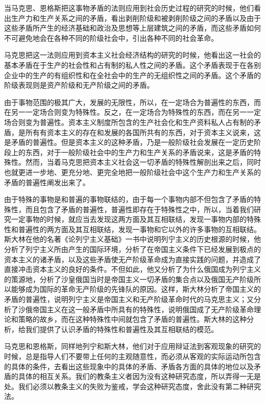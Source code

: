 \documentclass[UTF8, 12pt, a4paper]{ctexrep}
\begin{document}
当马克思、恩格斯把这事物矛盾的法则应用到社会历史过程的研究的时候，他们看出生产力和生产关系之间的矛盾，看出剥削阶级和被剥削阶级之间的矛盾以及由于这些矛盾所产生的经济基础和政治及思想等上层建筑之间的矛盾，而这些矛盾如何不可避免地会在各种不同的阶级社会中，引出各种不同的社会革命。

马克思把这一法则应用到资本主义社会经济结构的研究的时候，他看出这一社会的基本矛盾在于生产的社会性和占有制的私人性之间的矛盾。这个矛盾表现于在各别企业中的生产的有组织性和在全社会中的生产的无组织性之间的矛盾。这个矛盾的阶级表现则是资产阶级和无产阶级之间的矛盾。

由于事物范围的极其广大，发展的无限性，所以，在一定场合为普遍性的东西，而在另一一定场合则变为特殊性。反之，在一定场合为特殊性的东西，而在另一一定场合则变为普遍性。资本主义制度所包含的生产社会化和生产资料私人占有制的矛盾，是所有有资本主义的存在和发展的各国所共有的东西，对于资本主义说来，这是矛盾的普遍性。但是资本主义的这种矛盾，乃是一般阶级社会发展在一定历史阶段上的东西，对于一般阶级社会中的生产力和生产关系的矛盾说来，这是矛盾的特殊性。然而，当着马克思把资本主义社会这一切矛盾的特殊性解剖出来之后，同时也就更进一步地、更充分地、更完全地把一般阶级社会中这个生产力和生产关系的矛盾的普遍性阐发出来了。

由于特殊的事物是和普遍的事物联结的，由于每一个事物内部不但包含了矛盾的特殊性，而且包含了矛盾的普遍性，普遍性即存在于特殊性之中，所以，当着我们研究一定事物的时候，就应当去发现这两方面及其互相联结，发现一事物内部的特殊性和普遍性的两方面及其互相联结，发现一事物和它以外的许多事物的互相联结。斯大林在他的名著《论列宁主义基础》一书中说明列宁主义的历史根源的时候，他分析了列宁主义所由产生的国际环境，分析了在帝国主义条件下已经发展到极点的资本主义的诸矛盾，以及这些矛盾使无产阶级革命成为直接实践的问题，并造成了直接冲击资本主义的良好的条件。不但如此，他又分析了为什么俄国成为列宁主义的策源地，分析了沙皇俄国当时是帝国主义一切矛盾的集合点以及俄国无产阶级所以能够成为国际的革命无产阶级的先锋队的原因。这样，斯大林分析了帝国主义的矛盾的普遍性，说明列宁主义是帝国主义和无产阶级革命时代的马克思主义；又分析了沙俄帝国主义在这一般矛盾中所具有的特殊性，说明俄国成了无产阶级革命理论和策略的故乡，而在这种特殊性中间就包含了矛盾的普遍性。斯大林的这种分析，给我们提供了认识矛盾的特殊性和普遍性及其互相联结的模范。

马克思和恩格斯，同样地列宁和斯大林，他们对于应用辩证法到客观现象的研究的时候，总是指导人们不要带上任何的主观随意性，而必须从客观的实际运动所包含的具体的条件，去看出这些现象中的具体的矛盾、矛盾各方面的具体的地位以及矛盾的具体的相互关系。我们的教条主义者因为没有这种研究态度，所以弄得一无是处。我们必须以教条主义的失败为鉴戒，学会这种研究态度，舍此没有第二种研究法。
\end{document}
